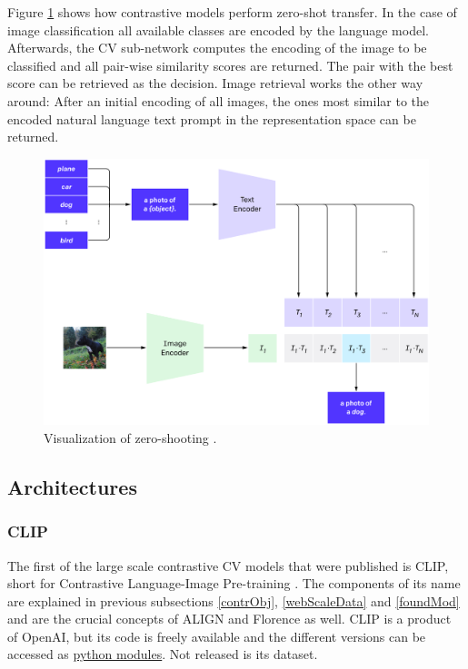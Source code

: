 \documentclass[
]{krantz}
\begin{document}
Figure \ref{fig:zero-shooting} shows how contrastive models perform zero-shot transfer.
In the case of image classification all available classes are encoded by the language model.
Afterwards, the CV sub-network computes the encoding of the image to be classified and all pair-wise similarity scores are returned.
The pair with the best score can be retrieved as the decision.
Image retrieval works the other way around:
After an initial encoding of all images, the ones most similar to the encoded natural language text prompt in the representation space can be returned.

\begin{figure}

{\centering \includegraphics[width=1\linewidth]{figures/02-04-text-support-img/zero-shooting} 

}

\caption{Visualization of zero-shooting \citep{radford2021learning}.}\label{fig:zero-shooting}
\end{figure}



\hypertarget{architectures}{%
\subsection{Architectures}\label{architectures}}

\hypertarget{clip}{%
\subsubsection{CLIP}\label{clip}}

The first of the large scale contrastive CV models that were published is CLIP, short for Contrastive Language-Image Pre-training \citep{radford2021learning}.
The components of its name are explained in previous subsections \ref{contrObj}, \ref{webScaleData} and \ref{foundMod} and are the crucial concepts of ALIGN and Florence as well.
CLIP is a product of OpenAI, but its code is freely available and the different versions can be accessed as \href{https://github.com/openai/CLIP}{python modules}.
Not released is its dataset.
\end{document}
